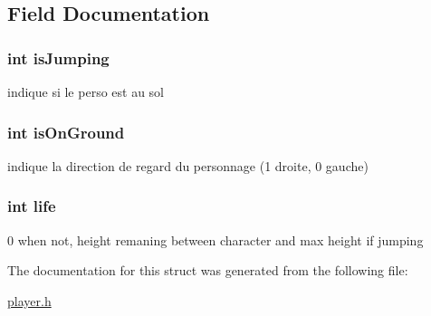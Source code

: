 \subsection{Field Documentation}
\hypertarget{struct_character_a6a61db42178df20e0afd7a5b65412735}{
\subsubsection[{is\-Jumping}]{\setlength{\rightskip}{0pt plus 5cm}int is\-Jumping}}\label{struct_character_a6a61db42178df20e0afd7a5b65412735}
indique si le perso est au sol \hypertarget{struct_character_aa4061d19d285d0ef281f333dee8f9a00}{
\subsubsection[{is\-On\-Ground}]{\setlength{\rightskip}{0pt plus 5cm}int is\-On\-Ground}}\label{struct_character_aa4061d19d285d0ef281f333dee8f9a00}
indique la direction de regard du personnage (1 droite, 0 gauche) \hypertarget{struct_character_adf488ff0ce8098cd956c07890cbc5d50}{
\subsubsection[{life}]{\setlength{\rightskip}{0pt plus 5cm}int life}}\label{struct_character_adf488ff0ce8098cd956c07890cbc5d50}
0 when not, height remaning between character and max height if jumping 

The documentation for this struct was generated from the following file\-:\begin{DoxyCompactItemize}
\item 
\hyperlink{player_8h}{player.\-h}\end{DoxyCompactItemize}

